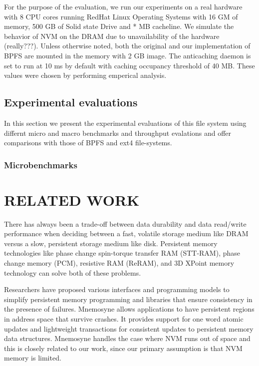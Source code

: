 \documentclass[letterpaper, 10 pt, conference]{ieeeconf}  %
\begin{document}
For the purpose of the evaluation, we run our experiments on a real hardware with 8 CPU cores running RedHat Linux Operating Systems with 16 GM of memory, 500 GB of Solid state Drive and * MB cacheline. We simulate the behavior of NVM on the DRAM due to unavailability of the hardware (really???). Unless otherwise noted, both the original and our implementation of BPFS are mounted in the memory with 2 GB image. The anticaching daemon is set to run at 10 ms by default with caching occupancy threshold of 40 MB. These values were chosen by performing emperical analysis.    

\subsection{Experimental evaluations}
In this section we present the experimental evaluations of this file system using differnt micro and macro benchmarks and throughput evalations and offer comparisons with those of BPFS and ext4 file-systems. 

\subsubsection{Microbenchmarks}


\section{RELATED WORK}

There has always been a trade-off between data durability and data read/write performance when deciding between a fast, volatile storage medium like DRAM versus a slow, persistent storage medium like disk. Persistent memory technologies like phase change spin-torque transfer RAM (STT-RAM), phase change memory (PCM), resistive RAM (ReRAM), and 3D XPoint memory technology can solve both of these problems\cite{c9}.

Researchers have proposed various interfaces and programming models \cite{c4,c6} to simplify persistent memory programming and libraries that ensure consistency in the presence of failures. Mnemosyne \cite{c6} allows applications to have persistent regions in address space that survive crashes. It provides support for one word atomic updates and lightweight transactions for consistent updates to persistent memory data structures. Mnemosyne handles the case where NVM runs out of space and this is closely related to our work, since our primary assumption is that NVM memory is limited.
\end{document}
